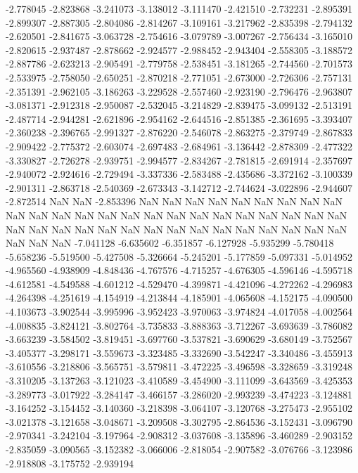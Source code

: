 -2.778045
-2.823868
-3.241073
-3.138012
-3.111470
-2.421510
-2.732231
-2.895391
-2.899307
-2.887305
-2.804086
-2.814267
-3.109161
-3.217962
-2.835398
-2.794132
-2.620501
-2.841675
-3.063728
-2.754616
-3.079789
-3.007267
-2.756434
-3.165010
-2.820615
-2.937487
-2.878662
-2.924577
-2.988452
-2.943404
-2.558305
-3.188572
-2.887786
-2.623213
-2.905491
-2.779758
-2.538451
-3.181265
-2.744560
-2.701573
-2.533975
-2.758050
-2.650251
-2.870218
-2.771051
-2.673000
-2.726306
-2.757131
-2.351391
-2.962105
-3.186263
-3.229528
-2.557460
-2.923190
-2.796476
-2.963807
-3.081371
-2.912318
-2.950087
-2.532045
-3.214829
-2.839475
-3.099132
-2.513191
-2.487714
-2.944281
-2.621896
-2.954162
-2.644516
-2.851385
-2.361695
-3.393407
-2.360238
-2.396765
-2.991327
-2.876220
-2.546078
-2.863275
-2.379749
-2.867833
-2.909422
-2.775372
-2.603074
-2.697483
-2.684961
-3.136442
-2.878309
-2.477322
-3.330827
-2.726278
-2.939751
-2.994577
-2.834267
-2.781815
-2.691914
-2.357697
-2.940072
-2.924616
-2.729494
-3.337336
-2.583488
-2.435686
-3.372162
-3.100339
-2.901311
-2.863718
-2.540369
-2.673343
-3.142712
-2.744624
-3.022896
-2.944607
-2.872514
NaN
NaN
-2.853396
NaN
NaN
NaN
NaN
NaN
NaN
NaN
NaN
NaN
NaN
NaN
NaN
NaN
NaN
NaN
NaN
NaN
NaN
NaN
NaN
NaN
NaN
NaN
NaN
NaN
NaN
NaN
NaN
NaN
NaN
NaN
NaN
NaN
NaN
NaN
NaN
NaN
NaN
NaN
NaN
NaN
NaN
-7.041128
-6.635602
-6.351857
-6.127928
-5.935299
-5.780418
-5.658236
-5.519500
-5.427508
-5.326664
-5.245201
-5.177859
-5.097331
-5.014952
-4.965560
-4.938909
-4.848436
-4.767576
-4.715257
-4.676305
-4.596146
-4.595718
-4.612581
-4.549588
-4.601212
-4.529470
-4.399871
-4.421096
-4.272262
-4.296983
-4.264398
-4.251619
-4.154919
-4.213844
-4.185901
-4.065608
-4.152175
-4.090500
-4.103673
-3.902544
-3.995996
-3.952423
-3.970063
-3.974824
-4.017058
-4.002564
-4.008835
-3.824121
-3.802764
-3.735833
-3.888363
-3.712267
-3.693639
-3.786082
-3.663239
-3.584502
-3.819451
-3.697760
-3.537821
-3.690629
-3.680149
-3.752567
-3.405377
-3.298171
-3.559673
-3.323485
-3.332690
-3.542247
-3.340486
-3.455913
-3.610556
-3.218806
-3.565751
-3.579811
-3.472225
-3.496598
-3.328659
-3.319248
-3.310205
-3.137263
-3.121023
-3.410589
-3.454900
-3.111099
-3.643569
-3.425353
-3.289773
-3.017922
-3.284147
-3.466157
-3.286020
-2.993239
-3.474223
-3.124881
-3.164252
-3.154452
-3.140360
-3.218398
-3.064107
-3.120768
-3.275473
-2.955102
-3.021378
-3.121658
-3.048671
-3.209508
-3.302795
-2.864536
-3.152431
-3.096790
-2.970341
-3.242104
-3.197964
-2.908312
-3.037608
-3.135896
-3.460289
-2.903152
-2.835059
-3.090565
-3.152382
-3.066006
-2.818054
-2.907582
-3.076766
-3.123986
-2.918808
-3.175752
-2.939194
